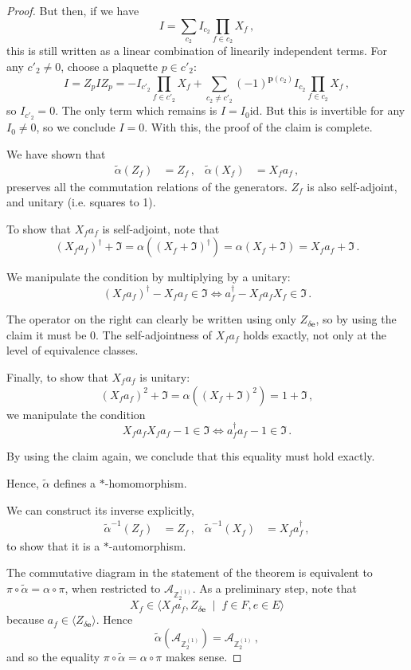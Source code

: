 \documentclass[10pt,a4paper]{amsart}
\newcommand{\Z}{{\mathbb Z}}
\newcommand{\be}{\begin{equation}}
\newcommand{\ee}{\end{equation}}
\newcommand{\id}{\text{id}}
\newcommand{\mc}[1]{\mathcal{#1}}
\newcommand{\paren}[1]{\left( #1 \right)}
\begin{document}
\begin{proof}
 But then, if we have
 \be
 I = \sum_{c_2} I_{c_2} \prod_{f \in c_2} X_f \,,
 \ee
 this is still written as a linear combination of linearily independent terms. For any $c'_2 \neq 0$, choose a plaquette $p \in c'_2$:
 \be
 I = Z_p I Z_p = - I_{c'_2} \prod_{f \in c'_2} X_f + \sum_{c_2 \neq c'_2} (-1)^{\bm{p}(c_2)} I_{c_2} \prod_{f \in c_2} X_f \,,
 \ee
 so $I_{c'_2} = 0$. The only term which remains is $I = I_0 \id{}$. But this is invertible for any $I_0 \neq 0$, so we conclude $I = 0$. With this, the proof of the claim is complete.
 
 We have shown that
 \begin{align}
  \tilde{\alpha}(Z_f) &= Z_f \,, & \tilde{\alpha}(X_f) &= X_f a_f \,,
 \end{align}
 preserves all the commutation relations of the generators. $Z_f$ is also self-adjoint, and unitary (i.e. squares to 1).

 To show that $X_f a_f$ is self-adjoint, note that
 \be
 (X_f a_f)^\dag + \mathfrak{I} = \alpha\paren{(X_f + \mathfrak{I})^\dag} = \alpha\paren{X_f + \mathfrak{I}} = X_f a_f + \mathfrak{I} \,.
 \ee

 We manipulate the condition by multiplying by a unitary:
 \be
 (X_f a_f)^\dag - X_f a_f \in \mathfrak{I} \iff a_f^\dag - X_f a_f X_f \in \mathfrak{I} \,.
 \ee

 The operator on the right can clearly be written using only $Z_{\delta \bm{e}}$, so by using the claim it must be $0$. The self-adjointness of $X_f a_f$ holds exactly, not only at the level of equivalence classes.

 Finally, to show that $X_f a_f$ is unitary:
 \be
 (X_f a_f)^2 + \mathfrak{I} = \alpha\paren{(X_f + \mathfrak{I})^2} = 1 + \mathfrak{I} \,,
 \ee
 we manipulate the condition
 \be
 X_f a_f X_f a_f - 1 \in \mathfrak{I} \iff a_f^\dag a_f - 1 \in \mathfrak{I} \,.
 \ee

 By using the claim again, we conclude that this equality must hold exactly.

 Hence, $\tilde{\alpha}$ defines a $*$-homomorphism.

 We can construct its inverse explicitly,
 \begin{align}
  \tilde{\alpha}^{-1}(Z_f) &= Z_f \,, & \tilde{\alpha}^{-1}(X_f) &= X_f a_f^\dag \,,
 \end{align}
 to show that it is a $*$-automorphism.

 The commutative diagram in the statement of the theorem is equivalent to $\pi \circ \tilde{\alpha} = \alpha \circ \pi$, when restricted to $\mc{A}_{\Z_2^{(1)}}$. As a preliminary step, note that
 \be
 X_f \in \langle X_f a_f, Z_{\delta \bm{e}} \; \mid \; f \in F, e \in E \rangle
 \ee
 because $a_f \in \langle Z_{\delta \bm{e}} \rangle$. Hence
 \be
 \tilde{\alpha} \paren{\mc{A}_{\Z_2^{(1)}}} = \mc{A}_{\Z_2^{(1)}} \,,
 \ee
 and so the equality $\pi \circ \tilde{\alpha} = \alpha \circ \pi$ makes sense.
 

\end{proof}
\end{document}
